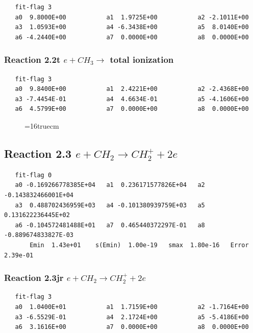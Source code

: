 \documentclass[12pt,dvipdfmx]{article}
\begin{document}
\begin{small}\begin{verbatim}
   fit-flag 3
   a0  9.8000E+00           a1  1.9725E+00           a2 -2.1011E+00
   a3  1.0593E+00           a4 -6.3438E+00           a5  8.0140E+00
   a6 -4.2440E+00           a7  0.0000E+00           a8  0.0000E+00
\end{verbatim}\end{small}


\subsubsection{
Reaction 2.2t  $e + CH_{3} \rightarrow$ total ionization
}

\begin{small}\begin{verbatim}
   fit-flag 3
   a0  9.8400E+00           a1  2.4221E+00           a2 -2.4368E+00
   a3 -7.4454E-01           a4  4.6634E-01           a5 -4.1606E+00
   a6  4.5799E+00           a7  0.0000E+00           a8  0.0000E+00
\end{verbatim}\end{small}

\begin{figure} \label{met.1_2.1}
\epsfxsize=16truecm
\end{figure}
\newpage

\subsection{
Reaction 2.3      $e + CH_2 \rightarrow  CH_2^+ + 2e $
}

\begin{small}\begin{verbatim}
   fit-flag 0
   a0 -0.169266778385E+04   a1  0.236171577826E+04   a2 -0.143832466001E+04
   a3  0.488702436959E+03   a4 -0.101380939759E+03   a5  0.131622236445E+02
   a6 -0.104572481488E+01   a7  0.465440372297E-01   a8 -0.889674833827E-03
       Emin  1.43e+01    s(Emin)  1.00e-19   smax  1.80e-16   Error  2.39e-01
\end{verbatim}\end{small}


\subsubsection{
Reaction 2.3jr      $e + CH_{2} \rightarrow CH_{2}^{+} + 2e $
}

\begin{small}\begin{verbatim}
   fit-flag 3
   a0  1.0400E+01           a1  1.7159E+00           a2 -1.7164E+00
   a3 -6.5529E-01           a4  2.1724E+00           a5 -5.4186E+00
   a6  3.1616E+00           a7  0.0000E+00           a8  0.0000E+00
\end{verbatim}\end{small}
\end{document}
